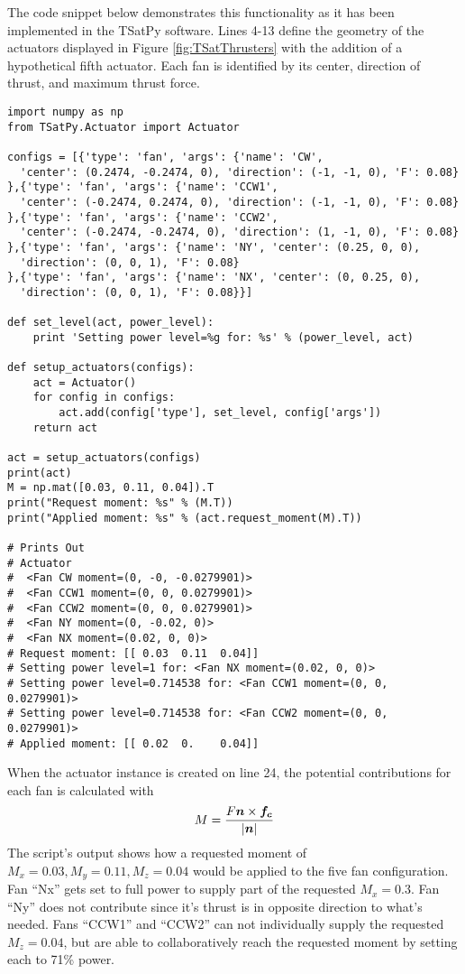 The code snippet below demonstrates this functionality as it has been implemented in the TSatPy software.  Lines 4-13 define the geometry of the actuators displayed in Figure \ref{fig:TSatThrusters} with the addition of a hypothetical fifth actuator.  Each fan is identified by its center, direction of thrust, and maximum thrust force.

\begin{singlespace}
  \begin{verbatim}
import numpy as np
from TSatPy.Actuator import Actuator

configs = [{'type': 'fan', 'args': {'name': 'CW',
  'center': (0.2474, -0.2474, 0), 'direction': (-1, -1, 0), 'F': 0.08}
},{'type': 'fan', 'args': {'name': 'CCW1',
  'center': (-0.2474, 0.2474, 0), 'direction': (-1, -1, 0), 'F': 0.08}
},{'type': 'fan', 'args': {'name': 'CCW2',
  'center': (-0.2474, -0.2474, 0), 'direction': (1, -1, 0), 'F': 0.08}
},{'type': 'fan', 'args': {'name': 'NY', 'center': (0.25, 0, 0),
  'direction': (0, 0, 1), 'F': 0.08}
},{'type': 'fan', 'args': {'name': 'NX', 'center': (0, 0.25, 0),
  'direction': (0, 0, 1), 'F': 0.08}}]

def set_level(act, power_level):
    print 'Setting power level=%g for: %s' % (power_level, act)

def setup_actuators(configs):
    act = Actuator()
    for config in configs:
        act.add(config['type'], set_level, config['args'])
    return act

act = setup_actuators(configs)
print(act)
M = np.mat([0.03, 0.11, 0.04]).T
print("Request moment: %s" % (M.T))
print("Applied moment: %s" % (act.request_moment(M).T))

# Prints Out
# Actuator
#  <Fan CW moment=(0, -0, -0.0279901)>
#  <Fan CCW1 moment=(0, 0, 0.0279901)>
#  <Fan CCW2 moment=(0, 0, 0.0279901)>
#  <Fan NY moment=(0, -0.02, 0)>
#  <Fan NX moment=(0.02, 0, 0)>
# Request moment: [[ 0.03  0.11  0.04]]
# Setting power level=1 for: <Fan NX moment=(0.02, 0, 0)>
# Setting power level=0.714538 for: <Fan CCW1 moment=(0, 0, 0.0279901)>
# Setting power level=0.714538 for: <Fan CCW2 moment=(0, 0, 0.0279901)>
# Applied moment: [[ 0.02  0.    0.04]]
  \end{verbatim}
\nocite{minted}
\end{singlespace}

When the actuator instance is created on line 24, the potential contributions for each fan is calculated with
\begin{equation}
  M = \frac{F \boldsymbol{n} \times \boldsymbol{f_c}}{|\boldsymbol{n}|}
\end{equation}
The script's output shows how a requested moment of $M_x = 0.03, M_y = 0.11, M_z = 0.04$ would be applied to the five fan configuration.  Fan ``Nx'' gets set to full power to supply part of the requested $M_x = 0.3$.  Fan ``Ny'' does not contribute since it's thrust is in opposite direction to what's needed.  Fans ``CCW1'' and ``CCW2'' can not individually supply the requested $M_z = 0.04$, but are able to collaboratively reach the requested moment by setting each to 71\% power.


